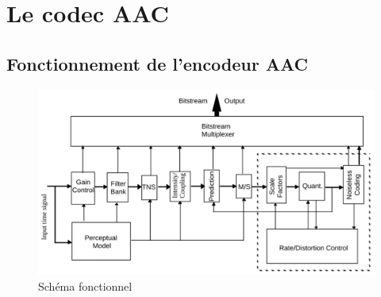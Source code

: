 \documentclass{article}
\begin{document}
    \newpage
    \section{Le codec AAC}
    \label{sec:AAC}
    \subsection{Fonctionnement de l'encodeur AAC}
    \begin{figure}[H]
        \centering
        \includegraphics[width=.6\linewidth]{./images/block-diagram-aac.png}
        \caption{Schéma fonctionnel }
        \label{fig:bloc-diagram-aac}
    \end{figure}




\end{document}
